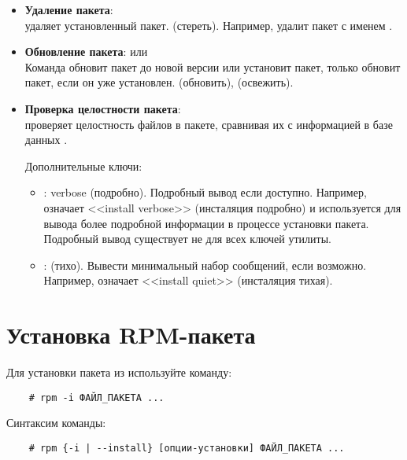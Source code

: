 \begin{itemize}
	\item \textbf{Удаление пакета}: \\
	 удаляет установленный пакет. 
	(стереть). Например,  удалит пакет с именем .

	\item \textbf{Обновление пакета}:  или \\
	Команда  обновит пакет до новой версии или установит пакет, 
	только обновит пакет, если он уже установлен. (обновить), (освежить).

	\item \textbf{Проверка целостности пакета}: \\
	 проверяет целостность файлов в пакете, сравнивая их с информацией в базе данных .

	Дополнительные ключи:
	\begin{itemize}
		\item \textbf{}: verbose (подробно). Подробный вывод если доступно. Например,  означает <<install verbose>>
	 (инсталяция подробно) и используется для вывода более подробной информации в процессе установки пакета. Подробный вывод существует не для всех ключей утилиты.
		\item \textbf{}: (тихо). Вывести минимальный набор сообщений, если возможно. Например,  означает <<install quiet>> (инсталяция тихая).
	\end{itemize}


\end{itemize}

\section{Установка RPM-пакета}

Для установки пакета из  используйте команду:
\begin{verbatim}
    # rpm -i ФАЙЛ_ПАКЕТА ...
\end{verbatim}

Синтаксим команды:
\begin{verbatim}
    # rpm {-i | --install} [опции-установки] ФАЙЛ_ПАКЕТА ...
\end{verbatim}

